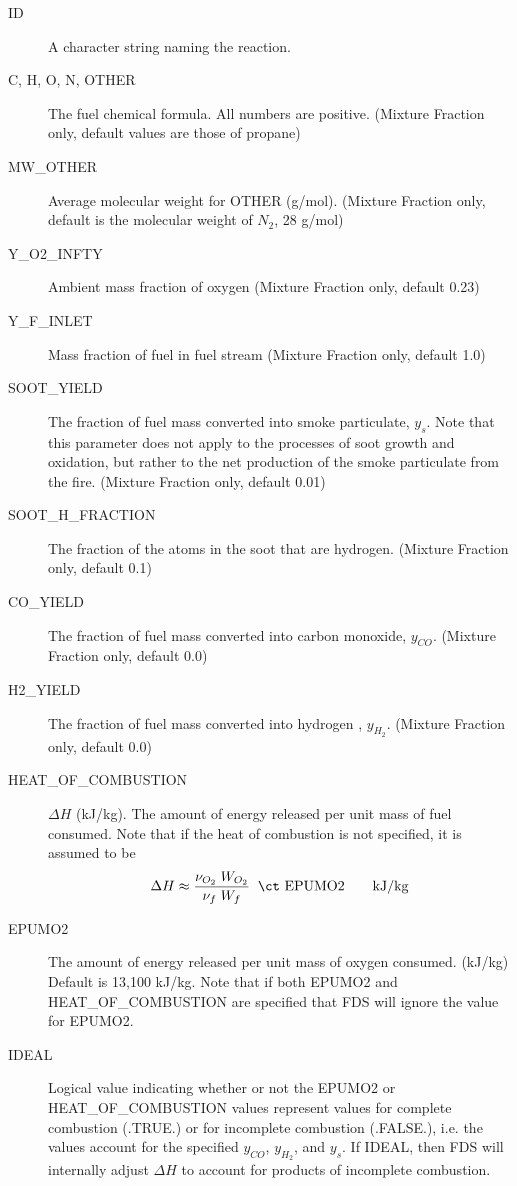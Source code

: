 \documentclass[11pt]{book}
\begin{document}
\begin{description}
\item[{\ct ID}] A character string naming the reaction.
\item[{\ct C, H, O, N, OTHER}] The fuel chemical formula. All numbers are positive.
(Mixture Fraction only, default values are those of propane)
\item[{\ct MW\_OTHER}] Average molecular weight for {\ct OTHER} (g/mol).
(Mixture Fraction only, default is the molecular weight of $N_2$, 28 g/mol)
\item[{\ct Y\_O2\_INFTY}] Ambient mass fraction of oxygen (Mixture Fraction only, default 0.23)
\item[{\ct Y\_F\_INLET}] Mass fraction of fuel in fuel stream (Mixture Fraction only, default 1.0)
\item[{\ct SOOT\_YIELD}] The fraction of fuel mass converted into smoke particulate, $y_s$.
Note that this parameter does not apply to the processes of soot growth and oxidation,
but rather to the net production of the smoke particulate from the fire.  (Mixture Fraction only, default 0.01)
\item[{\ct SOOT\_H\_FRACTION}] The fraction of the atoms in the soot that are hydrogen.
(Mixture Fraction only, default 0.1)
\item[{\ct CO\_YIELD}] The fraction of fuel mass converted into carbon
monoxide, $y_{CO}$. (Mixture Fraction only, default 0.0)
\item[{\ct H2\_YIELD}] The fraction of fuel mass converted into hydrogen
, $y_{H_2}$. (Mixture Fraction only, default 0.0)
\item[{\ct HEAT\_OF\_COMBUSTION}] $\Delta H$ (kJ/kg). The amount of
energy released per unit mass of fuel consumed. Note that if the heat of combustion is not
specified, it is assumed to be
$$ \Delta H \approx \frac{\nu_{O_2} \; W_{O_2} } { \nu_{f} \; W_{f} } \; \;
   \hbox{\ct EPUMO2}  \quad \quad \hbox{kJ/kg}  $$
\item[{\ct EPUMO2}] The amount of energy released per unit mass of oxygen consumed. (kJ/kg)
Default is 13,100 kJ/kg.  Note that if both {\ct EPUMO2} and {\ct HEAT\_OF\_COMBUSTION} are
specified that FDS will ignore the value for {\ct EPUMO2}.
\item[{\ct IDEAL}] Logical value indicating whether or not the {\ct EPUMO2} or {\ct  HEAT\_OF\_COMBUSTION}
values represent values for complete combustion ({\ct .TRUE.}) or for incomplete combustion ({\ct .FALSE.}),
i.e. the values account for the specified $y_{CO}$, $y_{H_2}$, and $y_s$.  If {\ct IDEAL}, then
FDS will internally adjust $\Delta H$ to account for products of incomplete combustion.
\end{description}
\end{document}
